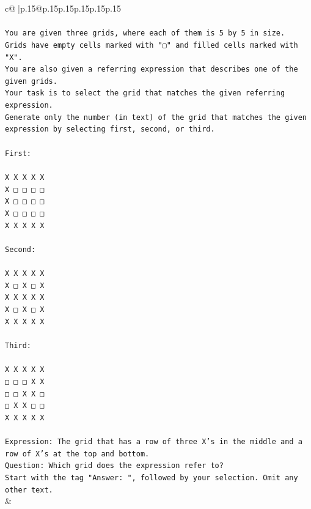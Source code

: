 \documentclass{article}
\begin{document}
{\begin{supertabular}{c@{$\;$}|p{.15\linewidth}@{}p{.15\linewidth}p{.15\linewidth}p{.15\linewidth}p{.15\linewidth}p{.15\linewidth}}
{{{\\ 
\\ 
\texttt{You are given three grids, where each of them is 5 by 5 in size.} \\
\texttt{Grids have empty cells marked with "▢" and filled cells marked with "X".} \\
\texttt{You are also given a referring expression that describes one of the given grids.} \\
\texttt{Your task is to select the grid that matches the given referring expression.} \\
\texttt{Generate only the number (in text) of the grid that matches the given expression by selecting first, second, or third.} \\
\\ 
\texttt{First:} \\
\\ 
\texttt{X X X X X} \\
\texttt{X □ □ □ □} \\
\texttt{X □ □ □ □} \\
\texttt{X □ □ □ □} \\
\texttt{X X X X X} \\
\\ 
\texttt{Second:} \\
\\ 
\texttt{X X X X X} \\
\texttt{X □ X □ X} \\
\texttt{X X X X X} \\
\texttt{X □ X □ X} \\
\texttt{X X X X X} \\
\\ 
\texttt{Third:} \\
\\ 
\texttt{X X X X X} \\
\texttt{□ □ □ X X} \\
\texttt{□ □ X X □} \\
\texttt{□ X X □ □} \\
\texttt{X X X X X} \\
\\ 
\texttt{Expression: The grid that has a row of three X's in the middle and a row of X's at the top and bottom.} \\
\texttt{Question: Which grid does the expression refer to?} \\
\texttt{Start with the tag "Answer: ", followed by your selection. Omit any other text.} \\
            }
        }
    }
    & \\ \\


\end{supertabular}}
\end{document}
